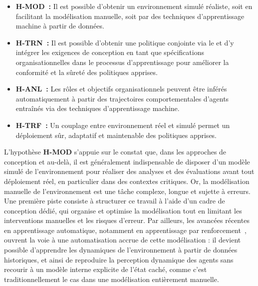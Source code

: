\begin{itemize}
  \item \textbf{H-MOD~:} Il est possible d'obtenir un environnement simulé réaliste, soit en facilitant la modélisation manuelle, soit par des techniques d'apprentissage machine à partir de données.
  \item \textbf{H-TRN~:} Il est possible d'obtenir une politique conjointe via le  et d'y intégrer les exigences de conception en tant que spécifications organisationnelles dans le processus d'apprentissage pour améliorer la conformité et la sûreté des politiques apprises.
  \item \textbf{H-ANL~:} Les rôles et objectifs organisationnels peuvent être inférés automatiquement à partir des trajectoires comportementales d'agents entraînés via des techniques d'apprentissage machine.
  \item \textbf{H-TRF~:} Un couplage entre environnement réel et simulé permet un déploiement sûr, adaptatif et maintenable des politiques apprises.
\end{itemize}

\noindent L'hypothèse \textbf{H-MOD} s'appuie sur le constat que, dans les approches de conception  et au-delà, il est généralement indispensable de disposer d'un modèle simulé de l'environnement pour réaliser des analyses et des évaluations avant tout déploiement réel, en particulier dans des contextes critiques. Or, la modélisation manuelle de l'environnement est une tâche complexe, longue et sujette à erreurs. Une première piste consiste à structurer ce travail à l'aide d'un cadre de conception dédié, qui organise et optimise la modélisation tout en limitant les interventions manuelles et les risques d'erreur. Par ailleurs, les avancées récentes en apprentissage automatique, notamment en apprentissage par renforcement~\cite{ha2018recurrent}, ouvrent la voie à une automatisation accrue de cette modélisation : il devient possible d'apprendre les dynamiques de l'environnement à partir de données historiques, et ainsi de reproduire la perception dynamique des agents sans recourir à un modèle interne explicite de l'état caché, comme c'est traditionnellement le cas dans une modélisation entièrement manuelle.

\medskip

